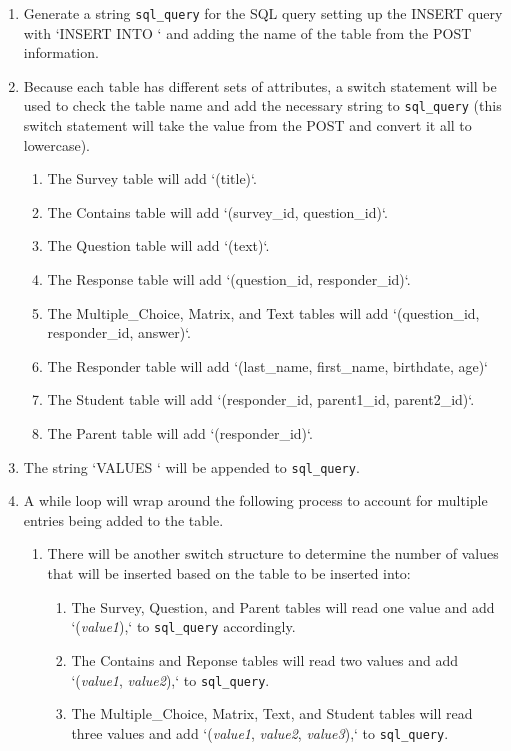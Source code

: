 \documentclass[letterpaper,10pt,serif, draftclsnofoot,onecolumn, compsoc, titlepage]{IEEEtran}
\begin{document}
\begin{enumerate}
	\item Generate a string \texttt{sql\_query} for the SQL query setting up the INSERT query with `INSERT INTO ` and adding the name of the table from the POST information.
	\item Because each table has different sets of attributes, a switch statement will be used to check the table name and add the necessary string to \texttt{sql\_query} (this switch statement will take the value from the POST and convert it all to lowercase).
	\begin{enumerate}
		\item The Survey table will add `(title)`.
		\item The Contains table will add `(survey\_id, question\_id)`.
		\item The Question table will add `(text)`.
		\item The Response table will add `(question\_id, responder\_id)`.
		\item The Multiple\_Choice, Matrix, and Text tables will add `(question\_id, responder\_id, answer)`.
		\item The Responder table will add `(last\_name, first\_name, birthdate, age)`
		\item The Student table will add `(responder\_id, parent1\_id, parent2\_id)`.
		\item The Parent table will add `(responder\_id)`.
	\end{enumerate}
	\item The string `VALUES ` will be appended to \texttt{sql\_query}.
	\item A while loop will wrap around the following process to account for multiple entries being added to the table.
	\begin{enumerate}
		\item There will be another switch structure to determine the number of values that will be inserted based on the table to be inserted into:
		\begin{enumerate}
			\item The Survey, Question, and Parent tables will read one value and add `(\emph{value1}),` to \texttt{sql\_query} accordingly.
			\item The Contains and Reponse tables will read two values and add `(\emph{value1}, \emph{value2}),` to \texttt{sql\_query}.
			\item The Multiple\_Choice, Matrix, Text, and Student tables will read three values and add `(\emph{value1}, \emph{value2}, \emph{value3}),` to \texttt{sql\_query}.

\end{enumerate}
\end{enumerate}
\end{enumerate}
\end{document}
